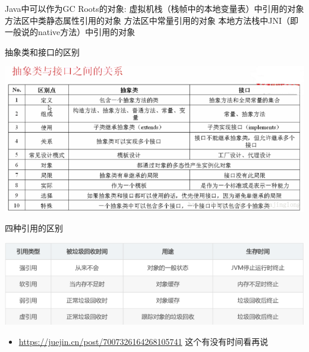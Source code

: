 \documentclass[9pt, b5paper]{article}
\begin{document}
Java中可以作为GC Roots的对象:
虚拟机栈（栈帧中的本地变量表）中引用的对象
方法区中类静态属性引用的对象
方法区中常量引用的对象
本地方法栈中JNI（即一般说的native方法）中引用的对象

抽象类和接口的区别

\includegraphics[width=.9\linewidth]{./pic/interface.png}

四种引用的区别

\includegraphics[width=.9\linewidth]{./pic/reference.png}

\begin{itemize}
\item \url{https://juejin.cn/post/7007326164268105741} 这个有没有时间看再说
\end{itemize}
\end{document}
